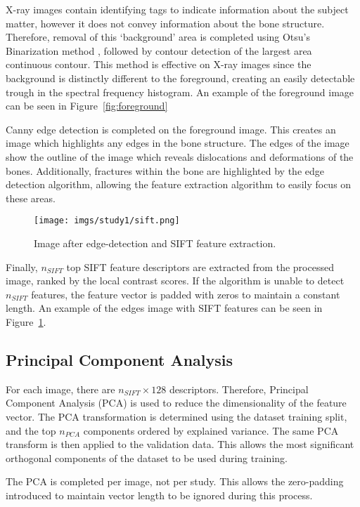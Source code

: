 \documentclass{IEEEtran}
\newcommand{\nsift}{\ensuremath{n_{SIFT}}}
\newcommand{\npca}{\ensuremath{n_{PCA}}}
\begin{document}
	X-ray images contain identifying tags to indicate information about the subject matter, however it does not convey information about the bone structure. Therefore, removal of this `background' area is completed using Otsu's Binarization method \cite{otsu1979threshold}, followed by contour detection of the largest area continuous contour. This method is effective on X-ray images since the background is distinctly different to the foreground, creating an easily detectable trough in the spectral frequency histogram. An example of the foreground image can be seen in Figure~\ref{fig:foreground}
	
	Canny edge detection is completed on the foreground image. This creates an image which highlights any edges in the bone structure. The edges of the image show the outline of the image which reveals dislocations and deformations of the bones. Additionally, fractures within the bone are highlighted by the edge detection algorithm, allowing the feature extraction algorithm to easily focus on these areas.
	
	\begin{figure}[t!]
		\centering
		\texttt{[image: imgs/study1/sift.png]}
		\caption{Image after edge-detection and SIFT feature extraction.}
		\label{fig:sift}
	\end{figure}
	
	Finally, $\nsift$ top SIFT feature descriptors are extracted from the processed image, ranked by the local contrast scores. If the algorithm is unable to detect $\nsift$ features, the feature vector is padded with zeros to maintain a constant length. An example of the edges image with SIFT features can be seen in Figure~\ref{fig:sift}.
	
	\subsection{Principal Component Analysis}
	
	For each image, there are $\nsift \times 128$ descriptors. Therefore, Principal Component Analysis (PCA) is used to reduce the dimensionality of the feature vector. The PCA transformation is determined using the dataset training split, and the top $\npca$ components ordered by explained variance. The same PCA transform is then applied to the validation data. This allows the most significant orthogonal components of the dataset to be used during training.
	
	The PCA is completed per image, not per study. This allows the zero-padding introduced to maintain vector length to be ignored during this process.
		
\end{document}
